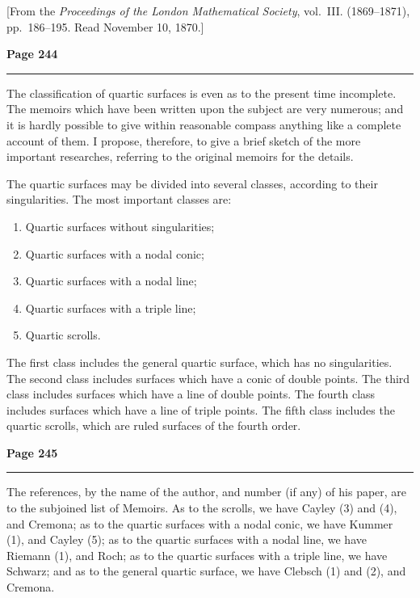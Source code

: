 \documentclass[12pt,a4paper]{article}
\theoremstyle{plain}
\theoremstyle{definition}
\theoremstyle{remark}
\begin{document}
\begin{center}
[From the \textit{Proceedings of the London Mathematical Society}, vol.~\textsc{III}. (1869--1871), pp.~186--195. Read November 10, 1870.]
\end{center}

\newpage
\noindent\textbf{Page 244}\\
\noindent\rule{\textwidth}{0.4pt}

\smallskip

\noindent The classification of quartic surfaces is even as to the present time incomplete. The memoirs which have been written upon the subject are very numerous; and it is hardly possible to give within reasonable compass anything like a complete account of them. I propose, therefore, to give a brief sketch of the more important researches, referring to the original memoirs for the details.

\noindent The quartic surfaces may be divided into several classes, according to their singularities. The most important classes are:

\begin{enumerate}
\item Quartic surfaces without singularities;
\item Quartic surfaces with a nodal conic;
\item Quartic surfaces with a nodal line;
\item Quartic surfaces with a triple line;
\item Quartic scrolls.
\end{enumerate}

\noindent The first class includes the general quartic surface, which has no singularities. The second class includes surfaces which have a conic of double points. The third class includes surfaces which have a line of double points. The fourth class includes surfaces which have a line of triple points. The fifth class includes the quartic scrolls, which are ruled surfaces of the fourth order.

\newpage
\noindent\textbf{Page 245}\\
\noindent\rule{\textwidth}{0.4pt}

\smallskip

\noindent The references, by the name of the author, and number (if any) of his paper, are to the subjoined list of Memoirs. As to the scrolls, we have Cayley (3) and (4), and Cremona; as to the quartic surfaces with a nodal conic, we have Kummer (1), and Cayley (5); as to the quartic surfaces with a nodal line, we have Riemann (1), and Roch; as to the quartic surfaces with a triple line, we have Schwarz; and as to the general quartic surface, we have Clebsch (1) and (2), and Cremona.
\end{document}
